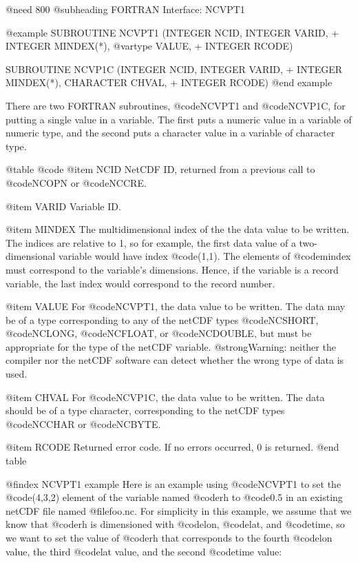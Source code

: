 @need 800
@subheading FORTRAN Interface:  NCVPT1

@example
      SUBROUTINE NCVPT1 (INTEGER NCID, INTEGER VARID,
     +                   INTEGER MINDEX(*), @var{type} VALUE,
     +                   INTEGER RCODE)

      SUBROUTINE NCVP1C (INTEGER NCID, INTEGER VARID,
     +                   INTEGER MINDEX(*), CHARACTER CHVAL,
     +                   INTEGER RCODE)
@end example

There are two FORTRAN subroutines, @code{NCVPT1} and @code{NCVP1C}, for
putting a single value in a variable.  The first puts a
numeric value in a variable of numeric type, and the second puts
a character value in a variable of character type.

@table @code
@item NCID
NetCDF ID, returned from a previous call to @code{NCOPN} or @code{NCCRE}.

@item VARID
Variable ID.

@item MINDEX
The multidimensional index of the the data value to be written.  The
indices are relative to 1, so for example, the first data value of a
two-dimensional variable would have index @code{(1,1)}.  The elements
of @code{mindex} must correspond to the variable's dimensions.  Hence, if
the variable is a record variable, the last index would correspond to
the record number.

@item VALUE
For @code{NCVPT1}, the data value to be written.  The data may be of a
type corresponding to any of the netCDF types @code{NCSHORT},
@code{NCLONG}, @code{NCFLOAT}, or @code{NCDOUBLE}, but must be appropriate
for the type of the netCDF variable.  @strong{Warning: neither the
compiler nor the netCDF software can detect whether the wrong type of data is
used.}

@item CHVAL
For @code{NCVP1C}, the data value to be written.  The data should be of
a type character, corresponding to the netCDF types @code{NCCHAR} or
@code{NCBYTE}.

@item RCODE
Returned error code.  If no errors occurred, 0 is returned.
@end table

@findex NCVPT1 example
Here is an example using @code{NCVPT1} to set the @code{(4,3,2)}
element of the variable named @code{rh} to @code{0.5} in an existing
netCDF file named @file{foo.nc}.  For simplicity in this example, we
assume that we know that @code{rh} is dimensioned with @code{lon},
@code{lat}, and @code{time}, so we want to set the value of @code{rh} that
corresponds to the fourth @code{lon} value, the third @code{lat} value,
and the second @code{time} value:

